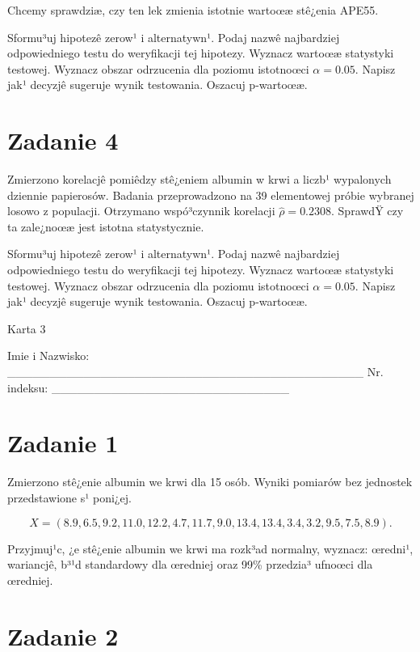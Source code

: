 \documentclass[a4paper,12pt]{article}
\begin{document}
  Chcemy sprawdziæ, czy ten lek zmienia istotnie wartoœæ stê¿enia APE55.
  
  Sformu³uj hipotezê zerow¹ i alternatywn¹. 
  Podaj nazwê najbardziej odpowiedniego testu do weryfikacji tej hipotezy. 
  Wyznacz wartoœæ statystyki testowej. 
  Wyznacz obszar odrzucenia dla poziomu istotnoœci $\alpha=0.05$. 
  Napisz jak¹ decyzjê sugeruje wynik testowania. Oszacuj p-wartoœæ. \vspace{1cm} 

  \section*{Zadanie 4}
     
     Zmierzono korelacjê pomiêdzy stê¿eniem albumin w krwi a liczb¹ wypalonych dziennie papierosów. 
     Badania przeprowadzono na 39 elementowej próbie wybranej losowo z populacji. 
     Otrzymano wspó³czynnik korelacji $\hat\rho = 0.2308 $. 
     SprawdŸ czy ta zale¿noœæ jest istotna statystycznie. 
     
     Sformu³uj hipotezê zerow¹ i alternatywn¹. 
     Podaj nazwê najbardziej odpowiedniego testu do weryfikacji tej hipotezy. 
     Wyznacz wartoœæ statystyki testowej. 
     Wyznacz obszar odrzucenia dla poziomu istotnoœci $\alpha=0.05$. 
     Napisz jak¹ decyzjê sugeruje wynik testowania. 
     Oszacuj p-wartoœæ. \vspace{1cm} 

  \clearpage  Karta  3  

 Imie i Nazwisko: \_\_\_\_\_\_\_\_\_\_\_\_\_\_\_\_\_\_\_\_\_\_\_\_\_\_\_\_\_\_\_\_\_\_\_\_\_\_\_\_\_\_ Nr. indeksu: \_\_\_\_\_\_\_\_\_\_\_\_\_\_\_\_\_\_\_\_\_\_\_\_\_\_\_\_ 
 \section*{Zadanie 1}
     
     Zmierzono stê¿enie albumin we krwi dla 15 osób. 
     Wyniki pomiarów bez jednostek przedstawione s¹ poni¿ej. 
     
     \noindent $$X=(  8.9,  6.5,  9.2, 11.0, 12.2,  4.7, 11.7,  9.0, 13.4, 13.4,  3.4,  3.2,  9.5,  7.5,  8.9 ).$$
     
     Przyjmuj¹c, ¿e stê¿enie albumin we krwi ma rozk³ad normalny, 
     wyznacz: œredni¹, wariancjê, b³¹d standardowy dla œredniej oraz 99\% przedzia³ ufnoœci dla œredniej. \vspace{1cm} 

  \section*{Zadanie 2}
     
\end{document}
